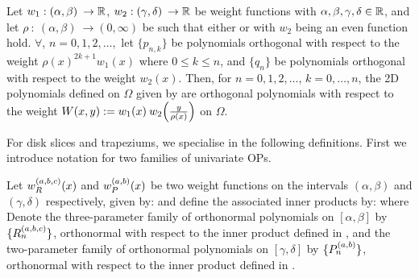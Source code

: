\begin{proposition}\label{prop:ds:construction}
	Let $w_1 : (\alpha,\beta) \: \to \mathbb{R}$, $w_2 : (\gamma,\delta) \: \to \mathbb{R}$ be weight functions with $\alpha,\beta,\gamma,\delta \in \mathbb{R}$, and let $\rho \: : \: (\alpha,\beta) \: \to (0,\infty)$ be such that either  or  with $w_2$ being an even function hold.
$\forall$, $n = 0,1,2,\dots, $ let $\{p_{n,k}\}$ be polynomials orthogonal with respect to the weight $\rho(x)^{2k+1} w_1(x)$ where $0 \le k \le n$, and $\{q_{n}\}$ be polynomials orthogonal with respect to the weight $w_2(x)$. Then, for $n = 0,1,2,\dots$, $k = 0,\dots,n$, the 2D polynomials defined on $\Omega$ given by
are orthogonal polynomials with respect to the weight $W(x,y) := w_1(x) \: w_2\fpr(\frac{y}{\rho(x)})$ on $\Omega$. 
\end{proposition}


For disk slices and trapeziums, we specialise  in the following definitions. First we introduce notation for two families of univariate OPs.  
\begin{definition}\label{def:ds:OPconstruction}
	Let $w_R^{(a,b,c)}(x)$ and $w_P^{(a,b)}(x)$ be two weight functions on the intervals $(\alpha, \beta)$ and $(\gamma, \delta)$ respectively, given by:
and define the associated inner products by:  
where
Denote the three-parameter family of orthonormal polynomials on $[\alpha,\beta]$ by  $\{R_n^{(a,b,c)}\}$, orthonormal with respect to the inner product defined in , and the two-parameter family of orthonormal polynomials on $[\gamma,\delta]$ by $\{{P}_n^{(a,b)}\}$, orthonormal with respect to the inner product defined in .
\end{definition}

